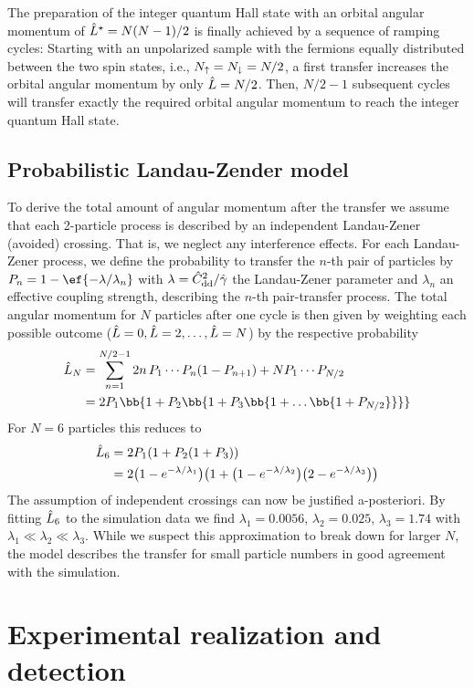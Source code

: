 The preparation of the integer quantum Hall state with an orbital angular momentum of ${\hat L}^{\star} = N(N-1)/2$ is finally achieved by a sequence of ramping cycles: Starting with an unpolarized sample with the fermions equally distributed between the two spin states, i.e.,  $N_\uparrow=N_\downarrow=N/2$, a first transfer increases the orbital angular momentum by only ${\hat L}=N/2$. Then, $N/2-1$ subsequent cycles will transfer exactly the required orbital angular momentum to reach the integer quantum Hall state.

\subsection{Probabilistic Landau-Zender model}
To derive the total amount of angular momentum after the transfer we assume that each 2-particle process is described by an independent Landau-Zener (avoided) crossing. That is, we neglect any interference effects. For each Landau-Zener process, we define the probability to transfer the $n$-th pair of particles by $P_n = 1-\ef{-\lambda/\lambda_n}$ with $\lambda={\hat C}_\text{dd}^2/{\hat \gamma}$ the Landau-Zener parameter and $\lambda_n$ an effective coupling strength, describing the $n$-th pair-transfer process. The total angular momentum for $N$ particles after one cycle is then given by weighting each possible outcome (${\hat L}=0,{\hat L}=2,\dots,{\hat L}=N$) by the respective probability
\begin{align*}
\dl{L}_N&=\sum_{n=1}^{N/2-1} 2n \,P_1\cdots P_n (1-P_{n+1})+N P_1\cdots P_{N/2}\\
&=2P_1\bb{1+P_2\bb{1+P_3\bb{1+\dots\bb{1+P_{N/2}}}}}
\end{align*}
For $N=6$ particles this reduces to
\begin{align*}
{\hat L}_6&=2 P_1(1+P_2(1+P_3))\\
&=2 \big(1-e^{-\lambda/\lambda_1}\big) \big(1+\big(1-e^{-\lambda/\lambda_2}\big) \big(2-e^{-\lambda/\lambda_3}\big)\big)
\end{align*}
The assumption of independent crossings can now be justified a-posteriori. By fitting ${\hat L}_6$ to the simulation data we find $\lambda_1=0.0056$, $\lambda_2=0.025$, $\lambda_3=1.74$ with $\lambda_1 \ll \lambda_2 \ll \lambda_3$. While we suspect this approximation to break down for larger $N$, the model describes the transfer for small particle numbers in good agreement with the simulation.

\section{Experimental realization and detection}

